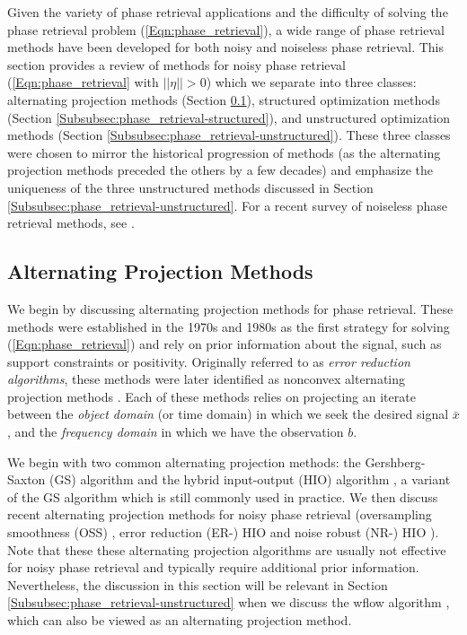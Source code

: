 Given the variety of phase retrieval applications and the difficulty of solving the phase retrieval problem (\ref{Eqn:phase_retrieval}), a wide range of phase retrieval methods have been developed for both noisy and noiseless phase retrieval.  This section provides a review of methods for noisy phase retrieval (\ref{Eqn:phase_retrieval} with $||\eta|| > 0$) which we separate into three classes: alternating projection methods (Section \ref{Subsubsec:phase_retrieval-alternating_direction_methods}), structured optimization methods (Section \ref{Subsubsec:phase_retrieval-structured}), and unstructured optimization methods (Section \ref{Subsubsec:phase_retrieval-unstructured}).  These three classes were chosen to mirror the historical progression of methods (as the alternating projection methods preceded the others by a few decades) and emphasize the uniqueness of the three unstructured methods discussed in Section \ref{Subsubsec:phase_retrieval-unstructured}.  For a recent survey of noiseless phase retrieval methods, see \cite{DBLP:journals/corr/JaganathanEH15a}.








\subsection{Alternating Projection Methods}		\label{Subsubsec:phase_retrieval-alternating_direction_methods}



We begin by discussing alternating projection methods for phase retrieval.  These methods were established in the 1970s and 1980s as the first strategy for solving (\ref{Eqn:phase_retrieval}) and rely on prior information about the signal, such as support constraints or positivity.  Originally referred to as \textit{error reduction algorithms}, these methods were later identified as nonconvex alternating projection methods \cite{LeviS84}.  Each of these methods relies on projecting an iterate between the \textit{object domain} (or time domain) in which we seek the desired signal $\bar{x}$, and the \textit{frequency domain} in which we have the observation $b$.  

We begin with two common alternating projection methods: the Gershberg-Saxton (GS) algorithm \cite{GS72} and the hybrid input-output (HIO) algorithm \cite{Fienup82}, a variant of the GS algorithm which is still commonly used in practice.  
We then discuss recent alternating projection methods for noisy phase retrieval (oversampling smoothness (OSS) \cite{rodriguez2013oversampling}, error reduction (ER-) HIO and noise robust (NR-) HIO \cite{martin2012noise}).
Note that these these alternating projection algorithms are usually not effective for noisy phase retrieval and typically require additional prior information.
Nevertheless, the discussion in this section will be relevant in Section \ref{Subsubsec:phase_retrieval-unstructured} when we discuss the wflow algorithm \cite{DBLP:journals/tit/CandesLS15}, which can also be viewed as an alternating projection method.  





